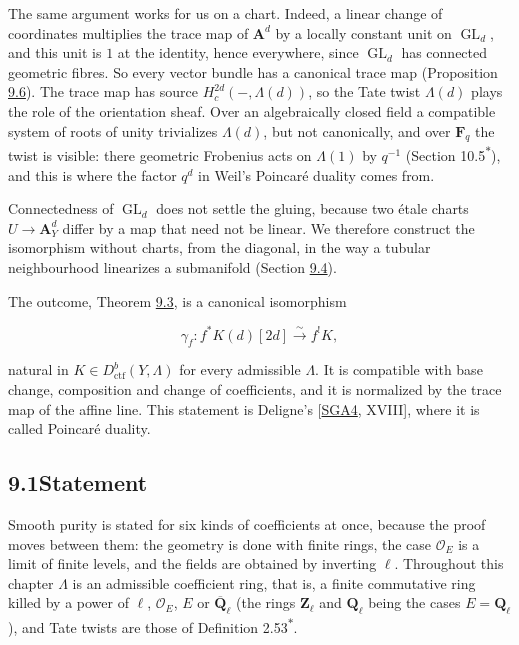 \documentclass[11pt]{article}
\newcommand{\bpout}[1]{#1\textsuperscript{\hyperlink{bp-outside}{\ensuremath{\ast}}}}
\begin{document}
The same argument works for us on a chart. Indeed, a linear change of coordinates multiplies the trace map of \(\mathbf A^d\) by a locally constant unit on \(\operatorname{GL}_d\), and this unit is \(1\) at the identity, hence everywhere, since \(\operatorname{GL}_d\) has connected geometric fibres. So every vector bundle has a canonical trace map (Proposition \hyperref[bp19]{9.6}). The trace map has source \(H^{2d}_c(-,\Lambda(d))\), so the Tate twist \(\Lambda(d)\) plays the role of the orientation sheaf. Over an algebraically closed field a compatible system of roots of unity trivializes \(\Lambda(d)\), but not canonically, and over \(\mathbf F_q\) the twist is visible: there geometric Frobenius acts on \(\Lambda(1)\) by \(q^{-1}\) (Section \bpout{10.5}), and this is where the factor \(q^d\) in Weil's Poincaré duality comes from.

Connectedness of \(\operatorname{GL}_d\) does not settle the gluing, because two étale charts \(U\to\mathbf A^d_Y\) differ by a map that need not be linear. We therefore construct the isomorphism without charts, from the diagonal, in the way a tubular neighbourhood linearizes a submanifold (Section \hyperref[bp22]{9.4}).

The outcome, Theorem \hyperref[bp9]{9.3}, is a canonical isomorphism

\[
\gamma_f:f^*K(d)[2d]\xrightarrow{\sim}f^!K,
\]

natural in \(K\in D^b_{\mathrm{ctf}}(Y,\Lambda)\) for every admissible \(\Lambda\). It is compatible with base change, composition and change of coefficients, and it is normalized by the trace map of the affine line. This statement is Deligne's [\hyperref[bp99]{SGA4}, XVIII], where it is called Poincaré duality.

\subsection*{\texorpdfstring{9.1\quad Statement}{9.1 Statement}}
\label{bp3}%
\label{bp4}%
Smooth purity is stated for six kinds of coefficients at once, because the proof moves between them: the geometry is done with finite rings, the case \(\mathcal O_E\) is a limit of finite levels, and the fields are obtained by inverting \(\ell\). Throughout this chapter \(\Lambda\) is an admissible coefficient ring, that is, a finite commutative ring killed by a power of \(\ell\), \(\mathcal O_E\), \(E\) or \(\overline{\mathbf Q}_\ell\) (the rings \(\mathbf Z_\ell\) and \(\mathbf Q_\ell\) being the cases \(E=\mathbf Q_\ell\)), and Tate twists are those of Definition \bpout{2.53}.
\end{document}
